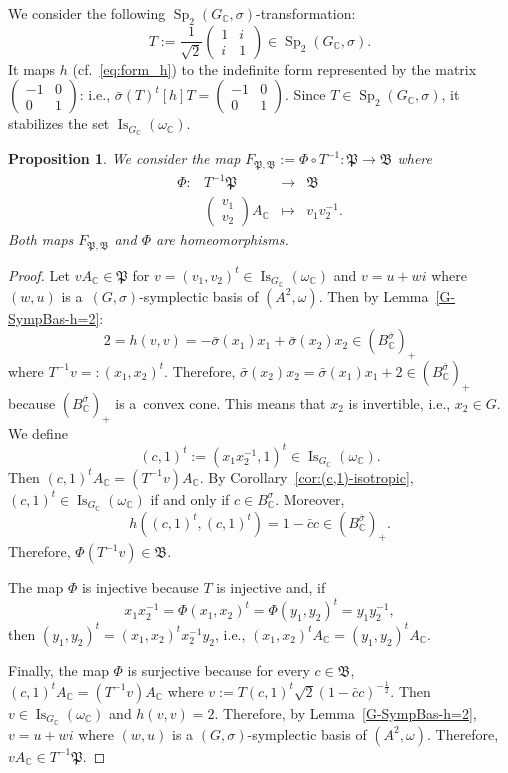 \documentclass[a4paper,oneside,11pt]{amsart}
\DeclareMathOperator{\Sp}{Sp}
\DeclareMathOperator{\Is}{Is}
\newcommand{\CC}{\mathbb C}
\theoremstyle{plain}
\newtheorem{prop}[teo]{Proposition}
\theoremstyle{definition}
\theoremstyle{remark}
\begin{document}
We consider the following $\Sp_2(G_\CC,\sigma)$-transformation:
$$T:=\frac{1}{\sqrt{2}}\begin{pmatrix}
1 & i \\
i & 1
\end{pmatrix}\in \Sp_2(G_\CC,\sigma).$$
It maps $h$ (cf.~\eqref{eq:form_h}) to the indefinite form represented by the matrix $\begin{pmatrix}
    -1 & 0 \\
    0 & 1
\end{pmatrix}$: i.e., $\bar\sigma(T)^t[h]T=\begin{pmatrix}
    -1 & 0 \\
    0 & 1
\end{pmatrix}$. Since $T\in\Sp_2(G_\CC,\sigma)$, it stabilizes the set $\Is_{G_\CC}(\omega_\CC)$.

\begin{prop}\label{Proj-Precomp-R}
We consider the map $F_{\mathfrak P,\mathfrak B}:=\Phi\circ T^{-1}\colon\mathfrak P\to \mathfrak B$ where
$$\begin{array}{cccl}
\Phi\colon & T^{-1}\mathfrak P & \to & \mathfrak B\\
 & \begin{pmatrix}
     v_1 \\ v_2
 \end{pmatrix}A_\CC & \mapsto & v_1v_2^{-1}.
\end{array}$$
Both maps $F_{\mathfrak P,\mathfrak B}$ and $\Phi$ are homeomorphisms.
\end{prop}

\begin{proof} Let $vA_\CC\in\mathfrak P$ for $v=(v_1,v_2)^t\in \Is_{G_\CC}(\omega_\CC)$ and $v=u+wi$ where $(w,u)$ is a~$(G,\sigma)$-symplectic basis of $(A^2,\omega)$. Then by Lemma~\ref{G-SympBas-h=2}:
$$2=h(v,v)=-\bar\sigma(x_1)x_1+\bar\sigma(x_2)x_2\in (B^{\bar\sigma}_\mathbb C)_+$$
where $T^{-1}v=:(x_1,x_2)^t$. Therefore, $\bar\sigma(x_2)x_2=\bar\sigma(x_1)x_1+2\in (B^{\bar\sigma}_\mathbb C)_+$ because $(B^{\bar\sigma}_\mathbb C)_+$ is a~convex cone. This means that $x_2$ is invertible, i.e., $x_2\in G$. We define 
$$(c,1)^t:=(x_1x_2^{-1},1)^t\in\Is_{G_\CC}(\omega_\CC).$$ Then $(c,1)^tA_\CC=(T^{-1}v)A_\CC$. By Corollary~\ref{cor:(c,1)-isotropic}, $(c,1)^t\in\Is_{G_\CC}(\omega_\CC)$ if and only if $c\in B^{\sigma}_\CC$. Moreover, 
$$h((c,1)^t,(c,1)^t)=1-\bar c c\in (B^{\bar\sigma}_\mathbb C)_+.$$ Therefore, $\Phi(T^{-1}v)\in \mathfrak B$.

The map $\Phi$ is injective because $T$ is injective and, if $$x_1x_2^{-1}=\Phi(x_1,x_2)^t=\Phi(y_1,y_2)^t=y_1y_2^{-1},$$
then $(y_1,y_2)^t=(x_1,x_2)^tx_2^{-1}y_2$, i.e., $(x_1,x_2)^tA_\CC=(y_1,y_2)^tA_\CC$.

Finally, the map $\Phi$ is surjective because for every $c\in \mathfrak B$, $(c,1)^tA_\CC=(T^{-1}v)A_\CC$ where $v:=T(c,1)^t\sqrt{2}(1-\bar c c)^{-\frac{1}{2}}$. Then $v\in \Is_{G_\CC}(\omega_\CC)$ and $h(v,v)=2$. Therefore, by Lemma~\ref{G-SympBas-h=2}, $v=u+wi$ where $(w,u)$ is a $(G,\sigma)$-symplectic basis of $(A^2,\omega)$. Therefore, $vA_\CC\in T^{-1}\mathfrak P$.
\end{proof}
\end{document}
